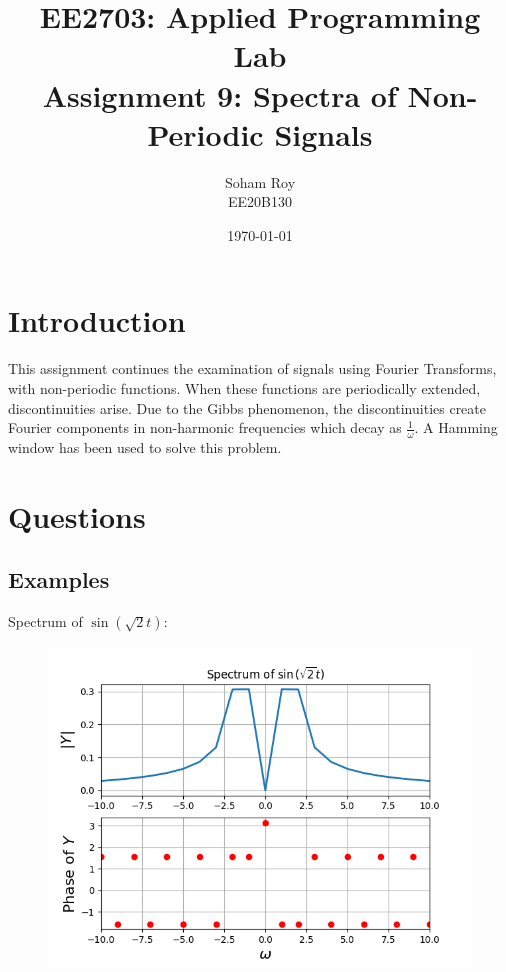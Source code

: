 \documentclass[12pt, a4paper]{article}
\title{EE2703: Applied Programming Lab \\ \Large Assignment 9: Spectra of Non-Periodic Signals}
\author{Soham Roy \\ \normalsize EE20B130}
\date{\today}
\begin{document}
\maketitle %



\section{Introduction}
This assignment continues the examination of signals using Fourier Transforms, with non-periodic functions.
When these functions are periodically extended, discontinuities arise. Due to the Gibbs phenomenon, the discontinuities create
Fourier components in non-harmonic frequencies which decay as $\frac{1}{\omega}$. A Hamming window has been used to solve this
problem.



\section{Questions}
\subsection{Examples}
Spectrum of $\sin(\sqrt{2}t)$:
\begin{figure}[H]
    \centering
    \includegraphics[scale=0.7]{eg1.png}
\end{figure}
\end{document}
